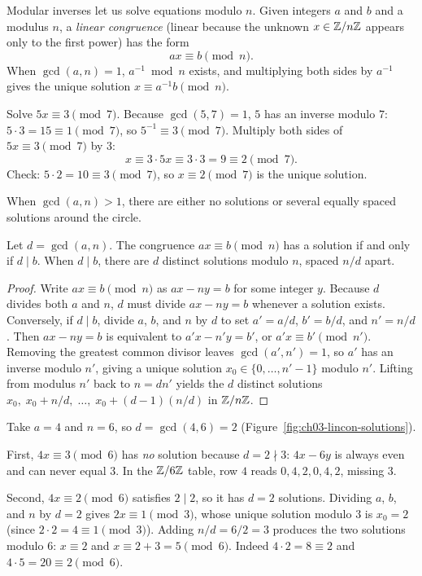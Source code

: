 Modular inverses let us solve equations modulo $n$. Given integers $a$ and $b$ and a modulus $n$, a \emph{linear congruence} (linear because the unknown $x \in \mathbb{Z}/n\mathbb{Z}$ appears only to the first power) has the form
\[
  ax \equiv b \pmod{n}.
\]
When $\gcd(a,n) = 1$, $a^{-1} \bmod n$ exists, and multiplying both sides by $a^{-1}$ gives the unique solution $x \equiv a^{-1} b \pmod{n}$.

\begin{example}
\label{ch03:lincon-unique}
Solve $5x \equiv 3 \pmod{7}$. Because $\gcd(5,7)=1$, $5$ has an inverse modulo $7$: $5\cdot 3 = 15 \equiv 1 \pmod{7}$, so $5^{-1} \equiv 3 \pmod{7}$. Multiply both sides of $5x \equiv 3 \pmod{7}$ by $3$:
\[
  x \equiv 3 \cdot 5x \equiv 3 \cdot 3 = 9 \equiv 2 \pmod{7}.
\]
Check: $5\cdot 2 = 10 \equiv 3 \pmod{7}$, so $x \equiv 2 \pmod{7}$ is the unique solution.
\end{example}

When $\gcd(a,n) > 1$, there are either no solutions or several equally spaced solutions around the circle.

\begin{theorem}
\label{ch03:lincon-general}
Let $d = \gcd(a,n)$. The congruence $ax \equiv b \pmod{n}$ has a solution if and only if $d \mid b$. When $d \mid b$, there are $d$ distinct solutions modulo $n$, spaced $n/d$ apart.
\end{theorem}

\begin{proof}
Write $ax \equiv b \pmod{n}$ as $ax - ny = b$ for some integer $y$. Because $d$ divides both $a$ and $n$, $d$ must divide $ax - ny = b$ whenever a solution exists. Conversely, if $d \mid b$, divide $a$, $b$, and $n$ by $d$ to set $a' = a/d$, $b' = b/d$, and $n' = n/d$. Then $ax - ny = b$ is equivalent to $a'x - n'y = b'$, or $a'x \equiv b' \pmod{n'}$. Removing the greatest common divisor leaves $\gcd(a', n') = 1$, so $a'$ has an inverse modulo $n'$, giving a unique solution $x_0 \in \{0, \dots, n'-1\}$ modulo $n'$. Lifting from modulus $n'$ back to $n = d n'$ yields the $d$ distinct solutions $x_0,\; x_0 + n/d,\; \dots,\; x_0 + (d-1)(n/d)$ in $\mathbb{Z}/n\mathbb{Z}$.
\end{proof}

\begin{example}
\label{ch03:lincon-degenerate}
Take $a = 4$ and $n = 6$, so $d = \gcd(4,6) = 2$ (Figure~\ref{fig:ch03-lincon-solutions}).

First, $4x \equiv 3 \pmod{6}$ has \emph{no} solution because $d = 2 \nmid 3$: $4x - 6y$ is always even and can never equal $3$. In the $\mathbb{Z}/6\mathbb{Z}$ table, row $4$ reads $0,4,2,0,4,2$, missing $3$.

Second, $4x \equiv 2 \pmod{6}$ satisfies $2 \mid 2$, so it has $d = 2$ solutions. Dividing $a$, $b$, and $n$ by $d = 2$ gives $2x \equiv 1 \pmod{3}$, whose unique solution modulo $3$ is $x_0 = 2$ (since $2\cdot 2 = 4 \equiv 1 \pmod{3}$). Adding $n/d = 6/2 = 3$ produces the two solutions modulo $6$: $x \equiv 2$ and $x \equiv 2 + 3 = 5 \pmod{6}$. Indeed $4\cdot 2 = 8 \equiv 2$ and $4\cdot 5 = 20 \equiv 2 \pmod{6}$.
\end{example}

